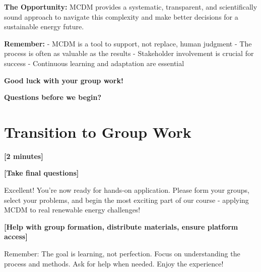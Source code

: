 \documentclass[12pt]{article}
\begin{document}
\textcolor{emphasis}{\textbf{The Opportunity:}} MCDM provides a systematic, transparent, and scientifically sound approach to navigate this complexity and make better decisions for a sustainable energy future.

\textcolor{emphasis}{\textbf{Remember:}}
- MCDM is a tool to support, not replace, human judgment
- The process is often as valuable as the results  
- Stakeholder involvement is crucial for success
- Continuous learning and adaptation are essential

\textcolor{emphasis}{\textbf{Good luck with your group work!}}

\textcolor{emphasis}{\textbf{Questions before we begin?}}

\section*{Transition to Group Work}
\textcolor{timing}{\textbf{[2 minutes]}}

\textcolor{speakernote}{\textbf{[Take final questions]}}

Excellent! You're now ready for hands-on application. Please form your groups, select your problems, and begin the most exciting part of our course - applying MCDM to real renewable energy challenges!

\textcolor{speakernote}{\textbf{[Help with group formation, distribute materials, ensure platform access]}}

Remember: The goal is learning, not perfection. Focus on understanding the process and methods. Ask for help when needed. Enjoy the experience!
\end{document}
